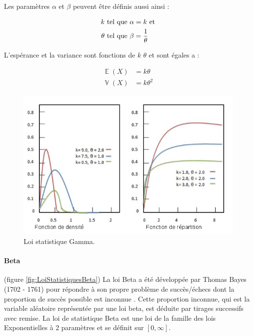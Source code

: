 \documentclass[a4paper,12pt]{report}
\DeclareMathOperator{\E}{\mathbb{E}} %
\DeclareMathOperator{\V}{\mathbb{V}} %
\theoremstyle{plain}				%
\theoremstyle{definition}				%
\begin{document}
Les paramètres $\alpha$ et $\beta$ peuvent être définis aussi ainsi :

   
\begin{align*}
   k 		& \textnormal{ tel que } \alpha = k  \textnormal{ et} \\
   \theta 	& \textnormal{ tel que } \beta  = \frac{1}{\theta}
\end{align*}

L’espérance et la variance sont fonctions de $k$ $\theta$ et sont égales a :

\begin{align*}
	\E(X) &= k \theta \\
	\V(X) &= k \theta ^2
\end{align*}

\begin{figure}
{\centering
\includegraphics[width=\columnwidth]{loiStatGamma.png}
\caption{Loi statistique Gamma.}
\label{fig:LoiStatistiquesGamma}
\par}
\end{figure}

\paragraph{Beta} (figure \ref{fig:LoiStatistiquesBeta})
La loi Beta a été développée par Thomas Bayes (1702 - 1761) pour répondre à son propre problème 
  de succès/échecs dont la proportion de succès possible est inconnue \cite{bayes1991essay}. Cette proportion inconnue, qui est la variable aléatoire représentée par une loi beta, est déduite par tirages successifs avec remise. 
La loi de statistique Beta est une loi de la famille des lois Exponentielles à 2 paramètres et se définit 
  sur $[0, \infty]$. 
 
\end{document}
